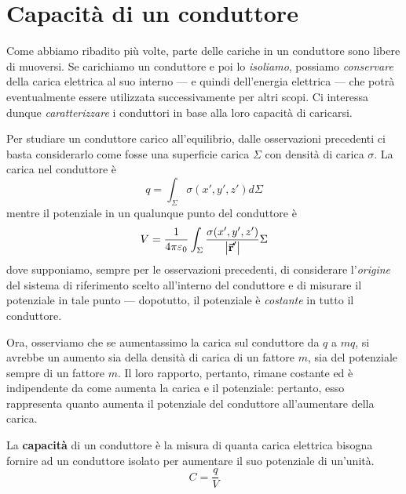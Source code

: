 \section{Capacità di un conduttore}
Come abbiamo ribadito più volte, parte delle cariche in un conduttore sono libere di muoversi. Se carichiamo un conduttore e poi lo \textit{isoliamo}, possiamo \textit{conservare} della carica elettrica al suo interno --- e quindi dell'energia elettrica --- che potrà eventualmente essere utilizzata successivamente per altri scopi. %
Ci interessa dunque \textit{caratterizzare} i conduttori in base alla loro capacità di caricarsi.
\begin{observe}
	Per studiare un conduttore carico all'equilibrio, dalle osservazioni precedenti ci basta considerarlo come fosse una superficie carica $\Sigma$ con densità di carica $\sigma$. La carica nel conduttore è
	\begin{equation*}
		q=\int_{\Sigma}\sigma\left(x',y',z'\right)d\Sigma
	\end{equation*}
	mentre il potenziale in un qualunque punto del conduttore è
	\begin{equation*}
		V=\frac{1}{4\pi\varepsilon_0}\int_{\Sigma}\frac{\sigma(x',y',z')}{\abs{\vb*{\va{r}}'}}\Sigma
	\end{equation*}
	dove supponiamo, sempre per le osservazioni precedenti, di considerare l'\textit{origine} del sistema di riferimento scelto all'interno del conduttore e di misurare il potenziale in tale punto --- dopotutto, il potenziale è \textit{costante} in tutto il conduttore.
\end{observe}%
Ora, osserviamo che se aumentassimo la carica sul conduttore da $q$ a $mq$, si avrebbe un aumento sia della densità di carica di un fattore $m$, sia del potenziale sempre di un fattore $m$. Il loro rapporto, pertanto, rimane costante ed è indipendente da come aumenta la carica e il potenziale: pertanto, esso rappresenta quanto aumenta il potenziale del conduttore all'aumentare della carica. 
\begin{define}
	La \textbf{capacità} di un conduttore è la misura di quanta carica elettrica bisogna fornire ad un conduttore isolato per aumentare il suo potenziale di un'unità.
	\begin{equation}
		C=\frac{q}{V}
	\end{equation}
\end{define}
